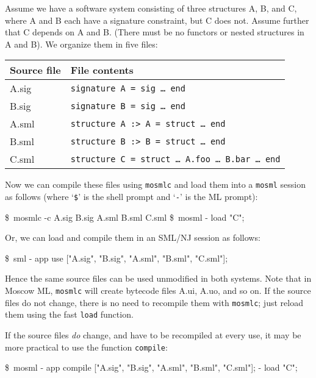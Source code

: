 \documentclass[fleqn]{article}
\begin{document}
Assume we have a software system consisting of three structures A, B,
and C, where A and B each have a signature constraint, but C does not.
Assume further that C depends on A and B\@.  (There must be no functors
or nested structures in A and B).  We organize them in five files:

\begin{quot}
\begin{tabular}{|l|l|}\hline
Source file & File contents\\\hline
A.sig   & \tt signature A = sig \ldots\ end\\
B.sig   & \tt signature B = sig \ldots\ end\\
A.sml   & \tt structure A :> A = struct \ldots\ end\\
B.sml   & \tt structure B :> B = struct \ldots\ end\\
C.sml   & \tt structure C = struct \ldots\ A.foo \ldots\ B.bar \ldots\ end\\\hline
\end{tabular}
\end{quot}

\noindent Now we can compile these files using {\tt mosmlc} and load
them into a {\tt mosml} session as follows (where `\verb#$#' is the
shell prompt and `\verb#-#' is the ML prompt):

\begin{program}
\$\ mosmlc -c A.sig B.sig A.sml B.sml C.sml
\$\ mosml
- load "C";
\end{program}

\noindent Or, we can load and compile them in an SML/NJ session as
follows:

\begin{program}
\$\ sml
- app use ["A.sig", "B.sig", "A.sml", "B.sml", "C.sml"];
\end{program}

\noindent Hence the same source files can be used unmodified in both
systems.  Note that in Moscow ML, {\tt mosmlc} will create bytecode
files A.ui, A.uo, and so on.  If the source files do not change, there
is no need to recompile them with {\tt mosmlc}; just reload them using
the fast {\tt load} function.

If the source files {\em do\/} change, and have to be recompiled at
every use, it may be more practical to use the function {\tt compile}:

\begin{program}
\$\ mosml
- app compile ["A.sig", "B.sig", "A.sml", "B.sml", "C.sml"];
- load "C";
\end{program}
\end{document}
